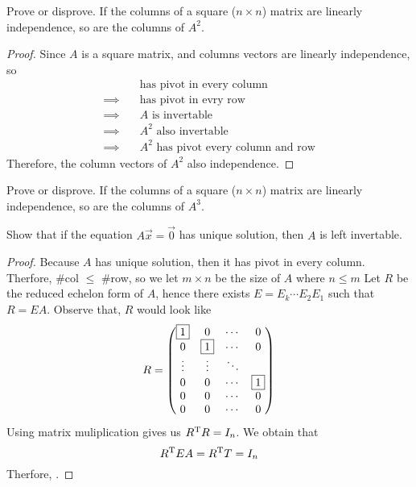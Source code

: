 \documentclass{article}
\def\by{\times}
\begin{document}
\setcounter{exercise}{5}
\begin{exercise}
  Prove or disprove. If the columns of a square ($n\by n$)
  matrix are linearly independence, so are the columns of $A^2$.
\end{exercise}
\begin{proof}
  Since $A$ is a square matrix, and columns vectors are linearly 
  independence, so
  \begin{align*}
    &\text{has pivot in every column}\\\implies\quad
    &\text{has pivot in evry row}\\\implies\quad
    &A\text{ is invertable}\\\implies\quad
    &A^2\text{ also invertable}\\\implies\quad
    &A^2\text{ has pivot every column and row}
  \end{align*}
  Therefore, the column vectors of $A^2$ also independence.
\end{proof}
\begin{exercise}
  Prove or disprove. If the columns of a square ($n\by n$)
  matrix are linearly independence, so are the columns of $A^3$.
\end{exercise}
\begin{exercise}
  Show that if the equation $A\vec{x}=\vec{0}$ has unique solution,
  then $A$ is left invertable.
\end{exercise}
\begin{proof}
  Because $A$ has unique solution, then it has pivot in every
  column. Therfore, \#col $\leq$ \#row, so we let $m\by n$ be the size
  of $A$ where $n\leq m$
  Let $R$ be the reduced 
  echelon form of $A$, hence there exists $E=E_k\cdots E_2E_1$
  such that $R=EA$.
  Observe that, $R$ would look like
  \[
    R=
    \begin{pmatrix}
      \fbox{1} &0  &\cdots &0\\
      0 &\fbox{1}  &\cdots &0\\
      \vdots&\vdots&\ddots & \\
      0 &0  &\cdots &\fbox{1}\\
      0 &0  &\cdots &0\\
      0 &0  &\cdots &0\\
    \end{pmatrix}
  \]
  Using matrix muliplication gives us $R^\mathrm{T} R=I_n$. We obtain that
  \[
    R^\mathrm{T} EA=R^\mathrm{T} T=I_n
  \]
  Therfore, 
  .



\end{proof}
\end{document}
